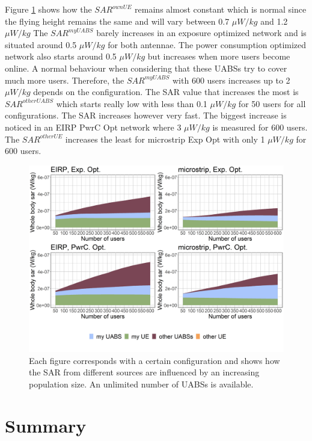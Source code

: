 Figure \ref{fig:s3b_fourSourcesMatrix} shows how the  $SAR^{ownUE}$  
remains almost constant which is normal since the flying height remains the same and will 
vary between  0.7 $\mu W/kg$ and 1.2 $\mu W/kg$
The $SAR^{myUABS}$ barely increases in an exposure optimized network and is situated around 0.5 $\mu W/kg$ for both antennae.
The power consumption optimized network also starts around 0.5 $\mu W/kg$ but increases when more users become online. 
A normal behaviour when considering that these \gls{UABS}s try to cover much more users. Therefore, the $SAR^{myUABS}$ 
with 600 users increases up to 2 $\mu W/kg$ depends on the configuration.
The \gls{SAR} value that increases the most is $SAR^{otherUABS}$ which 
starts really low with less than 0.1 $\mu W/kg$ for 50 users for all configurations. 
The \gls{SAR} increases however very fast. The biggest increase is noticed in an \gls{EIRP} \gls{PwrC Opt} network 
where 3 $\mu W/kg$ is measured for 600 users. The $SAR^{otherUE}$ increases the least for microstrip \gls{Exp Opt} with 
only 1 $\mu W/kg$ for 600 users.
\begin{figure}[h!]
  \includegraphics[width=\textwidth]{../results/s3/uFourSources.png}
  \caption{Each figure corresponds with a certain configuration and shows how the \acs{SAR} 
  from different sources are influenced by an increasing population size. An unlimited number of \acs{UABS}s is available.
}
  \label{fig:s3b_fourSourcesMatrix}
\end{figure}

\section{Summary}

